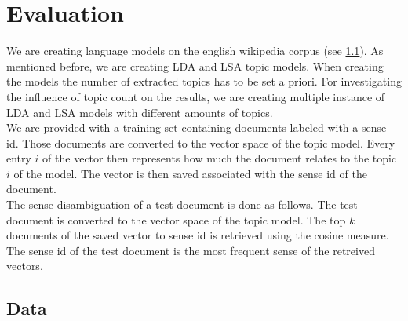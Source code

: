 \section{Evaluation}



We are creating language models on the english wikipedia corpus (see \ref{wikidump}). As mentioned before, we are creating LDA and LSA topic models. When creating the models the number of extracted topics has to be set a priori. For investigating the influence of topic count on the results, we are creating multiple instance of LDA and LSA models with different amounts of topics.\\
We are provided with a training set containing documents labeled with a sense id. Those documents are converted to the vector space of the topic model. Every entry $i$ of the vector then represents how much the document relates to the topic $i$ of the model. The vector is then saved associated with the sense id of the document.\\
The sense disambiguation of a test document is done as follows. The test document is converted to the vector space of the topic model. The top $k$ documents of the saved vector to sense id is retrieved using the cosine measure. The sense id of the test document is the most frequent sense of the retreived vectors.



\subsection{Data}
\label{wikidump}



